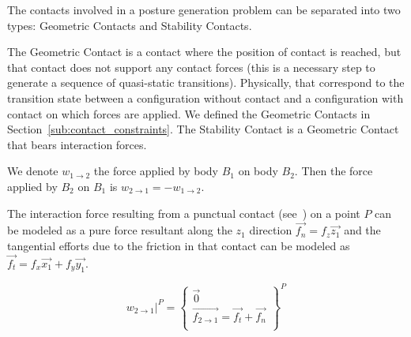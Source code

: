 
The contacts involved in a posture generation problem can be separated into two types: Geometric Contacts and Stability Contacts.

The Geometric Contact is a contact where the position of contact is reached, but that contact does not support any contact forces (this is a necessary step to generate a sequence of quasi-static transitions).
Physically, that correspond to the transition state between a configuration without contact and a configuration with contact on which forces are applied.
We defined the Geometric Contacts in Section~\ref{sub:contact_constraints}.
The Stability Contact is a Geometric Contact that bears interaction forces.


We denote $w_{1\rightarrow 2}$ the force applied by body $B_1$ on body $B_2$.
Then the force applied by $B_2$ on $B_1$ is $w_{2\rightarrow 1} = -w_{1\rightarrow 2}$.

The interaction force resulting from a punctual contact (see~) on a point $P$ can be modeled as a pure force resultant along the $z_1$ direction $\vec{f_n} = f_z \vec{z_1}$ and the tangential efforts due to the friction in that contact can be modeled as $\vec{f_t} = f_x \vec{x_1} + f_y \vec{y_1}$.

\begin{equation}
\label{eq:punctual_force}
\left. w_{2\rightarrow 1}\right|^P = \left\{
  \begin{array}{l}
    \vec{0} \\
    \overrightarrow{f_{2\rightarrow 1}} = \vec{f_t} + \vec{f_n} \\
  \end{array}
  \right\}^P
\end{equation}


